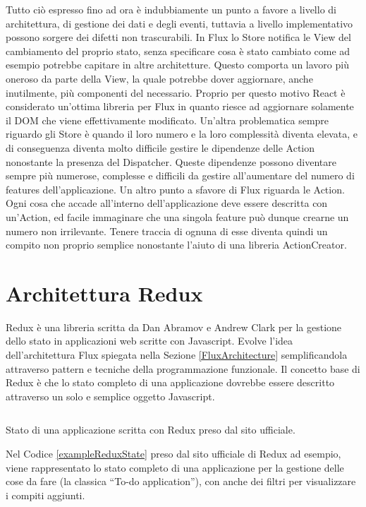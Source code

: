 Tutto ciò espresso fino ad ora è indubbiamente un punto a favore a livello di architettura, di gestione dei dati e degli eventi, tuttavia a livello implementativo possono sorgere dei difetti non trascurabili.
In Flux lo Store notifica le View del cambiamento del proprio stato, senza specificare cosa è stato cambiato come ad esempio potrebbe capitare in altre architetture. Questo comporta un lavoro più oneroso da parte della View, la quale potrebbe dover aggiornare, anche inutilmente, più componenti del necessario. Proprio per questo motivo React è considerato un'ottima libreria per Flux in quanto riesce ad aggiornare solamente il DOM che viene effettivamente modificato.
Un'altra problematica sempre riguardo gli Store è quando il loro numero e la loro complessità diventa elevata, e di conseguenza diventa molto difficile gestire le dipendenze delle Action nonostante la presenza del Dispatcher. Queste dipendenze possono diventare sempre più numerose, complesse e difficili da gestire all'aumentare del numero di features dell'applicazione.
Un altro punto a sfavore di Flux riguarda le Action. Ogni cosa che accade all'interno dell'applicazione deve essere descritta con un'Action, ed facile immaginare che una singola feature può dunque crearne un numero non irrilevante. Tenere traccia di ognuna di esse diventa quindi un compito non proprio semplice nonostante l'aiuto di una libreria ActionCreator.

\section{Architettura Redux}
\label{ReduxArchitecture}

Redux è una libreria scritta da Dan Abramov e Andrew Clark per la gestione dello stato in applicazioni web scritte con Javascript. Evolve l'idea dell'architettura Flux spiegata nella Sezione \ref{FluxArchitecture} semplificandola attraverso pattern e tecniche della programmazione funzionale. Il concetto base di Redux è che lo stato completo di una applicazione dovrebbe essere descritto attraverso un solo e semplice oggetto Javascript.

\begin{listing}[ht]
\inputminted{javascript}{sources/exampleReduxState.js}
\caption{Stato di una applicazione scritta con Redux preso dal sito ufficiale.} 
\label{exampleReduxState} 
\end{listing}

\noindent
Nel Codice \ref{exampleReduxState} preso dal sito ufficiale di Redux ad esempio, viene rappresentato lo stato completo di una applicazione per la gestione delle cose da fare (la classica “To-do application”), con anche dei filtri per visualizzare i compiti aggiunti.

